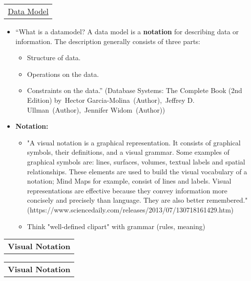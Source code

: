 \documentclass[11pt]{article}
\providecommand{\tightlist}{%
      \setlength{\itemsep}{0pt}\setlength{\parskip}{0pt}}
\begin{document}
\begin{longtable}[]{@{}c@{}}
\toprule
\tabularnewline
\midrule
\endhead
\href{https://en.wikipedia.org/wiki/Data_model}{Data
Model}\tabularnewline
\bottomrule
\end{longtable}

\begin{itemize}
\tightlist
\item
  ``What is a datamodel? A data model is a \textbf{notation} for
  describing data or information. The description generally consists of
  three parts:

  \begin{itemize}
  \tightlist
  \item
    Structure of data.
  \item
    Operations on the data.
  \item
    Constraints on the data.'' (Database Systems: The Complete Book (2nd
    Edition) by~Hector Garcia-Molina~(Author),~Jeffrey D.
    Ullman~(Author),~Jennifer Widom~(Author))
  \end{itemize}
\item
  \textbf{Notation:}

  \begin{itemize}
  \tightlist
  \item
    "A visual notation is a graphical representation. It consists of
    graphical symbols, their definitions, and a visual grammar. Some
    examples of graphical symbols are: lines, surfaces, volumes, textual
    labels and spatial relationships. These elements are used to build
    the visual vocabulary of a notation; Mind Maps for example, consist
    of lines and labels. Visual representations are effective because
    they convey information more concisely and precisely than language.
    They are also better remembered."
    (https://www.sciencedaily.com/releases/2013/07/130718161429.htm)
  \item
    Think "well-defined clipart" with grammar (rules, meaning)
  \end{itemize}
\end{itemize}

    \begin{longtable}[]{@{}c@{}}
\toprule
\tabularnewline
\midrule
\endhead
\textbf{Visual Notation}\tabularnewline
\bottomrule
\end{longtable}

\begin{longtable}[]{@{}c@{}}
\toprule
\tabularnewline
\midrule
\endhead
\textbf{Visual Notation}\tabularnewline
\bottomrule
\end{longtable}
\end{document}
